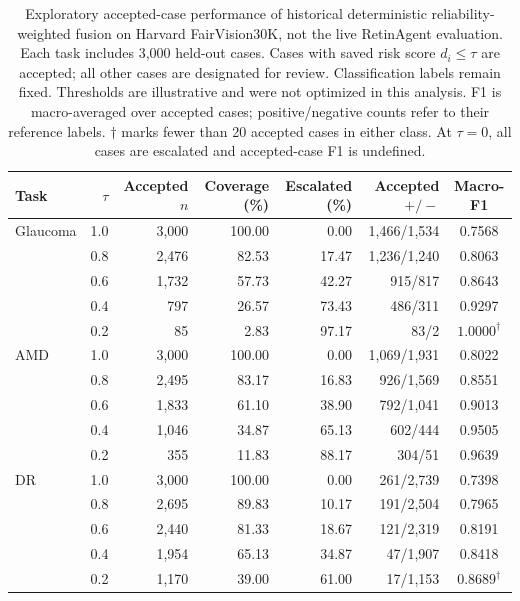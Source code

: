 \begin{table}[t]
\centering
\caption{Exploratory accepted-case performance of historical deterministic
reliability-weighted fusion on Harvard FairVision30K, not the live RetinAgent
evaluation. Each task includes 3,000 held-out cases. Cases with saved risk
score $d_i\leq\tau$ are accepted; all other cases are designated for review.
Classification labels remain fixed. Thresholds are illustrative and were
not optimized in this analysis. F1 is macro-averaged over accepted cases;
positive/negative counts refer to their reference labels.
$\dagger$ marks fewer than 20 accepted cases in either class.
At $\tau=0$, all cases are escalated and accepted-case F1 is undefined.}
\label{tab:historical_fusion_escalation}
\small
\begin{tabular}{@{}lrrrrrc@{}}
\toprule
Task & $\tau$ & Accepted $n$ & Coverage (\%) & Escalated (\%) &
Accepted $+/-$ & Macro-F1 \\
\midrule
Glaucoma & 1.0 & 3,000 & 100.00 &  0.00 & 1,466/1,534 & 0.7568 \\
         & 0.8 & 2,476 &  82.53 & 17.47 & 1,236/1,240 & 0.8063 \\
         & 0.6 & 1,732 &  57.73 & 42.27 &   915/817   & 0.8643 \\
         & 0.4 &   797 &  26.57 & 73.43 &   486/311   & 0.9297 \\
         & 0.2 &    85 &   2.83 & 97.17 &    83/2     & $1.0000^{\dagger}$ \\
\midrule
AMD      & 1.0 & 3,000 & 100.00 &  0.00 & 1,069/1,931 & 0.8022 \\
         & 0.8 & 2,495 &  83.17 & 16.83 &   926/1,569 & 0.8551 \\
         & 0.6 & 1,833 &  61.10 & 38.90 &   792/1,041 & 0.9013 \\
         & 0.4 & 1,046 &  34.87 & 65.13 &   602/444   & 0.9505 \\
         & 0.2 &   355 &  11.83 & 88.17 &   304/51    & 0.9639 \\
\midrule
DR       & 1.0 & 3,000 & 100.00 &  0.00 &   261/2,739 & 0.7398 \\
         & 0.8 & 2,695 &  89.83 & 10.17 &   191/2,504 & 0.7965 \\
         & 0.6 & 2,440 &  81.33 & 18.67 &   121/2,319 & 0.8191 \\
         & 0.4 & 1,954 &  65.13 & 34.87 &    47/1,907 & 0.8418 \\
         & 0.2 & 1,170 &  39.00 & 61.00 &    17/1,153 & $0.8689^{\dagger}$ \\
\bottomrule
\end{tabular}
\end{table}


